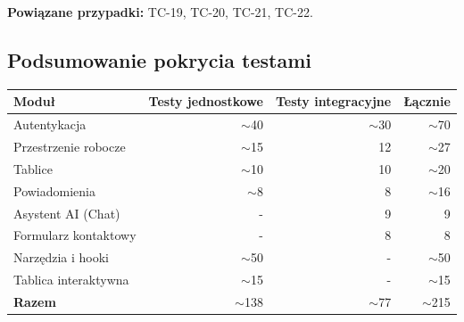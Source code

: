 \documentclass[12pt,a4paper]{article}
\begin{document}
\textbf{Powiązane przypadki:} TC-19, TC-20, TC-21, TC-22.

\subsection{Podsumowanie pokrycia testami}

\begin{center}
\begin{tabular}{lrrr}
\toprule
\textbf{Moduł} & \textbf{Testy jednostkowe} & \textbf{Testy integracyjne} & \textbf{Łącznie} \\
\midrule
Autentykacja        & $\sim$40 & $\sim$30 & $\sim$70 \\
Przestrzenie robocze & $\sim$15 & 12       & $\sim$27 \\
Tablice             & $\sim$10 & 10       & $\sim$20 \\
Powiadomienia       & $\sim$8  & 8        & $\sim$16 \\
Asystent AI (Chat)  & -      & 9        & 9        \\
Formularz kontaktowy & -     & 8        & 8        \\
Narzędzia i hooki   & $\sim$50 & -      & $\sim$50 \\
Tablica interaktywna & $\sim$15 & -     & $\sim$15 \\
\midrule
\textbf{Razem}      & $\sim$138 & $\sim$77 & $\sim$215 \\
\bottomrule
\end{tabular}
\end{center}
\end{document}
